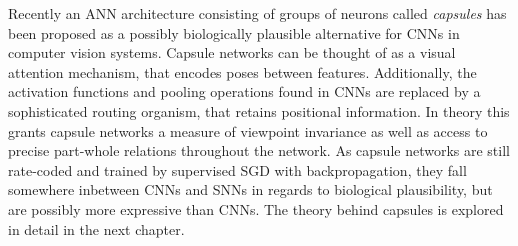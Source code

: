 Recently an ANN architecture consisting of groups of neurons called \emph{capsules} has been proposed as a possibly biologically plausible alternative for CNNs in computer vision systems. Capsule networks can be thought of as a visual attention mechanism, that encodes poses between features. Additionally, the activation functions and pooling operations found in CNNs are replaced by a sophisticated routing organism, that retains positional information. In theory this grants capsule networks a measure of viewpoint invariance as well as access to precise part-whole relations throughout the network. As capsule networks are still rate-coded and trained by supervised SGD with backpropagation, they fall somewhere inbetween CNNs and SNNs in regards to biological plausibility, but are possibly more expressive than CNNs. The theory behind capsules is explored in detail in the next chapter.